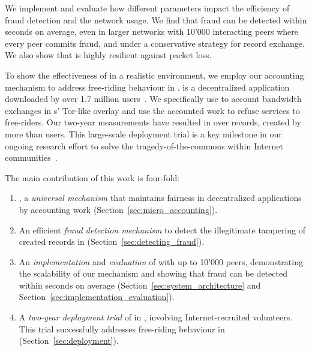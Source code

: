 We implement \TrustChain{} and evaluate how different parameters impact the efficiency of fraud detection and the network usage.
We find that fraud can be detected within seconds on average, even in larger networks with 10'000 interacting peers where every peer commits fraud, and under a conservative strategy for record exchange.
We also show that \TrustChain{} is highly resilient against packet loss.

To show the effectiveness of \TrustChain{} in a realistic environment, we employ our accounting mechanism to address free-riding behaviour in \Tribler{}.
\Tribler{} is a decentralized application downloaded by over 1.7 million users~\cite{pouwelse2008tribler}.
We specifically use \TrustChain{} to account bandwidth exchanges in \Tribler{}s' Tor-like overlay and use the accounted work to refuse services to free-riders.
Our two-year measurements have resulted in over \TrialRecords{} records, created by more than \TrialUsers{} users.
This large-scale deployment trial is a key milestone in our ongoing research effort to solve the tragedy-of-the-commons within Internet communities~\cite{de2018blockchain}.

The main contribution of this work is four-fold:
\begin{enumerate}
	\item \TrustChain{}, a \emph{universal mechanism} that maintains fairness in decentralized applications by accounting work (Section~\ref{sec:micro_accounting}).
	\item An efficient \emph{fraud detection mechanism} to detect the illegitimate tampering of created records in \TrustChain{} (Section~\ref{sec:detecting_fraud}).
	\item An \emph{implementation} and \emph{evaluation} of \TrustChain{} with up to 10'000 peers, demonstrating the scalability of our mechanism and showing that fraud can be detected within seconds on average (Section~\ref{sec:system_architecture} and Section~\ref{sec:implementation_evaluation}).
	\item A \emph{two-year deployment trial} of \TrustChain{} in \Tribler{}, involving \TrialUsers{} Internet-recruited volunteers. This trial successfully addresses free-riding behaviour in \Tribler{} (Section~\ref{sec:deployment}).
\end{enumerate}



